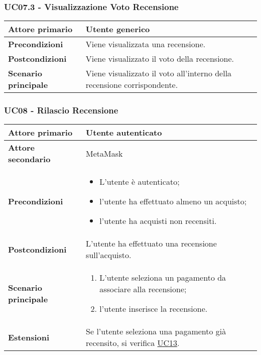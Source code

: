 \subsubsection{UC07.3 - Visualizzazione Voto Recensione}
\label{UC07.3}
\begin{center}
    \renewcommand{\arraystretch}{1.5}
    \begin{tabular}{ | m{10em} | m{20em} | }
        \hline
        \textbf{Attore primario} & Utente generico \\
        \hline
        \textbf{Precondizioni} & Viene visualizzata una recensione. \\
        \hline
        \textbf{Postcondizioni} & Viene visualizzato il voto della recensione. \\
        \hline
        \textbf{Scenario principale} & Viene visualizzato il voto all'interno della recensione corrispondente. \\
        \hline
       \end{tabular}
    \end{center}

\subsubsection{UC08 - Rilascio Recensione}
\label{UC08}
\begin{center}
\renewcommand{\arraystretch}{1.5}
\begin{tabular}{ | m{10em} | m{20em} | }
    \hline
    \textbf{Attore primario} & Utente autenticato \\
    \hline
    \textbf{Attore secondario} & MetaMask \\
    \hline
    \textbf{Precondizioni} & \begin{itemize}
        \item L'utente è autenticato;
        \item l'utente ha effettuato almeno un acquisto;
        \item l'utente ha acquisti non recensiti.
    \end{itemize} \\
    \hline
    \textbf{Postcondizioni} & L'utente ha effettuato una recensione sull'acquisto. \\
    \hline
    \textbf{Scenario principale} & \begin{enumerate}
        \item L'utente seleziona un pagamento da associare alla recensione;
        \item l'utente inserisce la recensione.
    \end{enumerate} \\
    \hline
    \textbf{Estensioni} & Se l'utente seleziona una pagamento già recensito, si verifica \hyperref[UC13]{UC13}. \\
    \hline
   \end{tabular}
\end{center}

